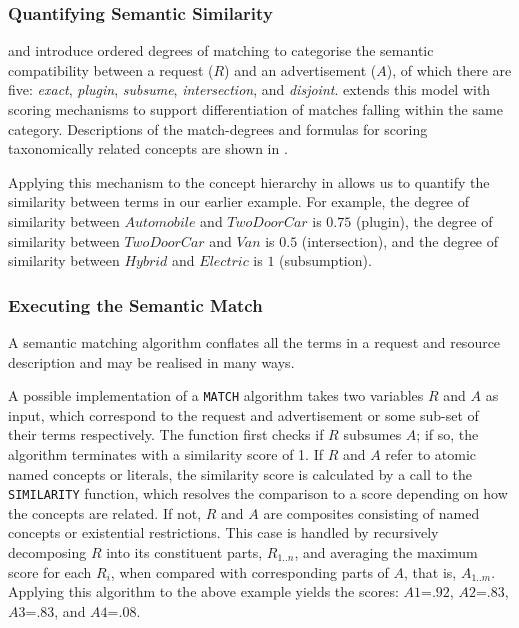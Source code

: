 \documentclass[12pt,a4paper,twoside,openright]{book}
\begin{document}
\subsubsection{Quantifying Semantic Similarity}
\label{ref:quantifying}
\cite{paolucci2002semantic} and \cite{li2003software} introduce ordered degrees of matching to categorise the semantic compatibility between a request ($R$) and an advertisement ($A$), of which there are five: \emph{exact}, \emph{plugin}, \emph{subsume}, \emph{intersection}, and \emph{disjoint}.
%
\cite{bandara2008semantic} extends this model with scoring mechanisms to support differentiation of matches falling within the same category.
%
Descriptions of the match-degrees and formulas for scoring taxonomically related concepts are shown in .

Applying this mechanism to the concept hierarchy in  allows us to quantify the similarity between terms in our earlier example.
%
For example, the degree of similarity between $Automobile$ and $TwoDoorCar$ is $0.75$ (plugin), the degree of similarity between $TwoDoorCar$ and $Van$ is $0.5$ (intersection), and the degree of similarity between $Hybrid$ and $Electric$ is $1$ (subsumption).

\subsubsection{Executing the Semantic Match}
\label{sec:match_algorithm}
A semantic matching algorithm conflates all the terms in a request and resource description and may be realised in many ways.

A possible implementation of a \texttt{MATCH} algorithm takes two variables $R$ and $A$ as input, which correspond to the request and advertisement or some sub-set of their terms respectively.
%
The function first checks if $R$ subsumes $A$; if so, the algorithm terminates with a similarity score of 1.
%
If $R$ and $A$ refer to atomic named concepts or literals, the similarity score is calculated by a call to the \texttt{SIMILARITY} function, which resolves the comparison to a score depending on how the concepts are related.
%
If not, $R$ and $A$ are composites consisting of named concepts or existential restrictions.
%
This case is handled by recursively decomposing $R$ into its constituent parts, $R_{1..n}$, and averaging the maximum score for each $R_i$, when compared with corresponding parts of $A$, that is, $A_{1..m}$.
%
Applying this algorithm to the above example yields the scores: $A1$=$.92$, $A2$=$.83$, $A3$=$.83$, and $A4$=$.08$.
\end{document}
